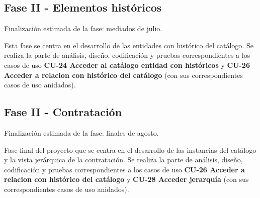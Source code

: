 \subsection{Fase II - Elementos históricos}
Finalización estimada de la fase: mediados de julio.

Esta fase se centra en el desarrollo de las entidades con histórico del catálogo. Se realiza la parte de análisis, diseño, codificación y pruebas correspondientes a los casos de uso \textbf{CU-24 Acceder al catálogo entidad con históricos} y \textbf{CU-26 Acceder a relacion con histórico del catálogo} (con sus correspondientes casos de uso anidados).


\subsection{Fase II - Contratación}
Finalización estimada de la fase: finales de agosto.

Fase final del proyecto que se centra en el desarrollo de las instancias del catálogo y la vista jerárquica de la contratación. Se realiza la parte de análisis, diseño, codificación y pruebas correspondientes a los casos de uso \textbf{CU-26 Acceder a relacion con histórico del catálogo} y \textbf{CU-28 Acceder jerarquía} (con sus correspondientes casos de uso anidados). 



